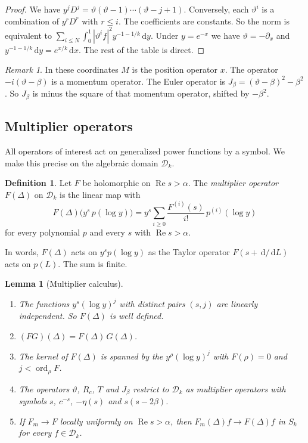 \documentclass[12pt,letterpaper]{article}
\newtheorem{lemma}[theorem]{Lemma}
\theoremstyle{definition}
\newtheorem{definition}[theorem]{Definition}
\theoremstyle{remark}
\newtheorem{remark}[theorem]{Remark}
\numberwithin{equation}{section}
\newcommand{\Ree}{\operatorname{Re}}
\newcommand{\dd}{\,\mathrm{d}}
\newcommand{\Dk}{\mathcal{D}_k}
\newcommand{\ord}{\operatorname{ord}}
\newcommand{\yD}{\vartheta}
\begin{document}
\begin{proof}
We have $y^jD^j=\yD(\yD-1)\cdots(\yD-j+1)$. Conversely, each $\yD^i$ is a
combination of $y^rD^r$ with $r\le i$. The coefficients are constants. So
the norm is equivalent to $\sum_{i\le N}\int_0^1|\yD^if|^2y^{-1-1/k}\dd y$.
Under $y=e^{-x}$ we have $\yD=-\partial_x$ and
$y^{-1-1/k}\dd y=e^{x/k}\dd x$. The rest of the table is direct.
\end{proof}

\begin{remark}
In these coordinates $M$ is the position operator $x$. The operator
$-i(\yD-\beta)$ is a momentum operator. The Euler operator is
$J_\beta=(\yD-\beta)^2-\beta^2$. So $J_\beta$ is minus the square of that
momentum operator, shifted by $-\beta^2$.
\end{remark}

\subsection{Multiplier operators}

All operators of interest act on generalized power functions by a symbol.
We make this precise on the algebraic domain $\Dk$.

\begin{definition}\label{def:multiplier}
Let $F$ be holomorphic on $\Ree s>\alpha$. The \emph{multiplier operator}
$F(\Delta)$ on $\Dk$ is the linear map with
\[
F(\Delta)\bigl(y^s\,p(\log y)\bigr)
=y^s\sum_{i\ge0}\frac{F^{(i)}(s)}{i!}\,p^{(i)}(\log y)
\]
for every polynomial $p$ and every $s$ with $\Ree s>\alpha$.
\end{definition}

In words, $F(\Delta)$ acts on $y^s p(\log y)$ as the Taylor operator
$F(s+\dd/\dd L)$ acts on $p(L)$. The sum is finite.

\begin{lemma}[Multiplier calculus]\label{lem:multiplier}
\begin{enumerate}[label=(\alph*)]
\item The functions $y^s(\log y)^j$ with distinct pairs $(s,j)$ are
  linearly independent. So $F(\Delta)$ is well defined.
\item $(FG)(\Delta)=F(\Delta)\,G(\Delta)$.
\item The kernel of $F(\Delta)$ is spanned by the $y^\rho(\log y)^j$ with
  $F(\rho)=0$ and $j<\ord_\rho F$.
\item The operators $\yD$, $R_c$, $T$ and $J_\beta$ restrict to $\Dk$ as
  multiplier operators with symbols $s$, $c^{-s}$, $-\eta(s)$ and
  $s(s-2\beta)$.
\item If $F_m\to F$ locally uniformly on $\Ree s>\alpha$, then
  $F_m(\Delta)f\to F(\Delta)f$ in $S_k$ for every $f\in\Dk$.
\end{enumerate}
\end{lemma}
\end{document}
